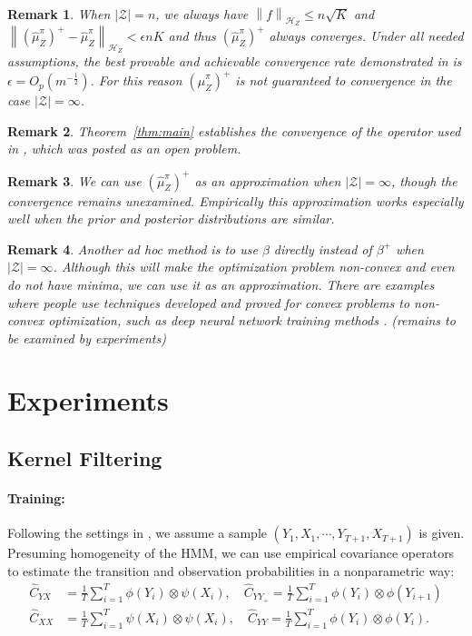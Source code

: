 \documentclass[a4paper]{article}
\renewcommand{\cal}{\mathcal}
\newcommand{\norm}[1]{\left\lVert#1\right\rVert}
\newtheorem{remark}{Remark}
\newcommand{\thmref}[1]{Theorem~\ref{#1}}
\begin{document}
\begin{remark}
When $|\cal{Z}| = n$, we always have $\norm{f}_{\cal{H}_Z} \leq n\sqrt{K}$ and $\norm{(\widehat{\mu}_Z^\pi)^+ - \widehat{\mu}_Z^\pi}_{\cal{H}_Z} < \epsilon n K$ and thus $(\widehat{\mu}_Z^\pi)^+$ always converges. Under all needed assumptions, the best provable and achievable convergence rate demonstrated in \cite{fukumizu2011kernel} is $\epsilon = O_p(m^{-\frac{1}{2}})$. For this reason $(\widehat{\mu}_Z^\pi)^+$ is not guaranteed to convergence in the case $|\cal{Z}| = \infty$.
\end{remark}
\begin{remark}
\thmref{thm:main} establishes the convergence of the operator used in \cite{nishiyama2012hilbert}, which was posted as an open problem.
\end{remark}
\begin{remark}
We can use $(\widehat{\mu}_Z^\pi)^+$ as an approximation when $|\cal{Z}| = \infty$, though the convergence remains unexamined. Empirically this approximation works especially well when the prior and posterior distributions are similar.
\end{remark}
\begin{remark}
Another ad hoc method is to use $\beta$ directly instead of $\beta^+$ when $|\cal{Z}| = \infty$. Although this will make the optimization problem non-convex and even do not have minima, we can use it as an approximation. There are examples where people use techniques developed and proved for convex problems to non-convex optimization, such as deep neural network training methods \cite{nesterov1983method}\cite{duchi2011adaptive}. ({\color{red}remains to be examined by experiments})
\end{remark}
\section{Experiments}
\subsection{Kernel Filtering}
\paragraph{Training:}
Following the settings in \cite{fukumizu2011kernel}, we assume a sample $(Y_1,X_1,\cdots,Y_{T+1},X_{T+1})$ is given. Presuming homogeneity of the HMM, we can use empirical covariance operators to estimate the transition and observation probabilities in a nonparametric way:
\begin{align}
\hat{C}_{YX} &= \frac{1}{T}\sum_{i=1}^T \phi(Y_i)\otimes\psi(X_i),\quad \hat{C}_{YY_+} = \frac{1}{T}\sum_{i=1}^T \phi(Y_{i})\otimes \phi(Y_{i+1})\\
\hat{C}_{XX} &= \frac{1}{T}\sum_{i=1}^T \psi(X_i) \otimes \psi(X_i),\quad \hat{C}_{YY} = \frac{1}{T}\sum_{i=1}^T \phi(Y_i)\otimes\phi(Y_i).
\end{align}
\end{document}
